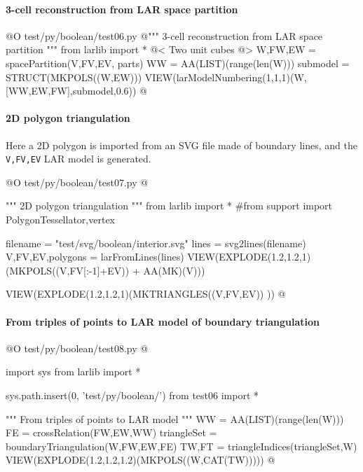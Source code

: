 \documentclass[11pt,oneside]{article}    %
\begin{document}
\paragraph{3-cell reconstruction from LAR space partition}
@O test/py/boolean/test06.py
@{""" 3-cell reconstruction from LAR space partition """
from larlib import *
@< Two unit cubes @>
W,FW,EW = spacePartition(V,FV,EV, parts)
WW = AA(LIST)(range(len(W)))
submodel = STRUCT(MKPOLS((W,EW)))
VIEW(larModelNumbering(1,1,1)(W,[WW,EW,FW],submodel,0.6))
@}



\paragraph{2D polygon triangulation}
Here a 2D polygon is imported from an SVG file made of boundary lines, and the \texttt{V,FV,EV}
LAR model is generated. 

@O test/py/boolean/test07.py
@{""" 2D polygon triangulation """
from larlib import *
#from support import PolygonTessellator,vertex

filename = "test/svg/boolean/interior.svg"
lines = svg2lines(filename)    
V,FV,EV,polygons = larFromLines(lines)
VIEW(EXPLODE(1.2,1.2,1)(MKPOLS((V,FV[:-1]+EV)) + AA(MK)(V)))

VIEW(EXPLODE(1.2,1.2,1)(MKTRIANGLES((V,FV,EV)) ))
@}


\paragraph{From triples of points to LAR model of boundary triangulation}
    
@O test/py/boolean/test08.py @{
import sys
from larlib import *

sys.path.insert(0, 'test/py/boolean/')
from test06 import *

""" From triples of points to LAR model """
WW = AA(LIST)(range(len(W)))
FE = crossRelation(FW,EW,WW)
triangleSet = boundaryTriangulation(W,FW,EW,FE)
TW,FT = triangleIndices(triangleSet,W)
VIEW(EXPLODE(1.2,1.2,1.2)(MKPOLS((W,CAT(TW)))))
@}
\end{document}
